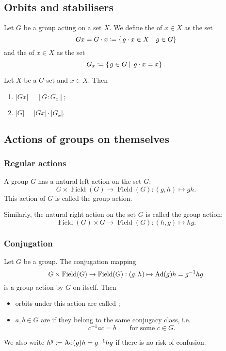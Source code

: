\subsection{Orbits and stabilisers}
\begin{definition}
Let $G$ be a group acting on a set $X$. We define the  of $x\in X$ as the set
\[ Gx = G\cdot x \coloneqq \left\{\left. g\cdot x \in X \;\right|\; g\in G \right\}  \]
and the  of $x\in X$ as the set
\[ G_x \coloneqq \left\{\left. g\in G \;\right|\; g\cdot x = x \right\}. \]
\end{definition}
\begin{proposition}
Let $X$ be a $G$-set and $x\in X$. Then
\begin{enumerate}
\item $|Gx| = [G:G_x]$;
\item $|G| = |Gx|\cdot |G_x|$.
\end{enumerate}
\end{proposition}

\subsection{Actions of groups on themselves}
\subsubsection{Regular actions}
\begin{definition}
A group $G$ has a natural left action on the set $G$:
\[ G\times \operatorname{Field}(G) \to \operatorname{Field}(G): (g,h) \mapsto gh. \]
This action of $G$ is called the  group action.

Similarly, the natural right action on the set $G$ is called the  group action:
\[ \operatorname{Field}(G) \times G \to \operatorname{Field}(G): (h,g) \mapsto hg. \]
\end{definition}

\subsubsection{Conjugation}
\begin{definition}
Let $G$ be a group. The conjugation mapping
\[ G\times \operatorname{Field}(G) \to \operatorname{Field}(G): (g,h) \mapsto \operatorname{Ad}(g)h = g^{-1}hg \]
is a group action by $G$ on itself. Then
\begin{itemize}
\item orbits under this action are called ;
\item $a,b\in G$ are  if they belong to the same conjugacy class, i.e.
\[ c^{-1}ac = b \qquad \text{for some $c\in G$.} \]
\end{itemize}
We also write $h^g \coloneqq \operatorname{Ad}(g)h = g^{-1}hg$ if there is no risk of confusion.
\end{definition}


